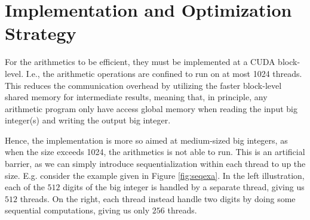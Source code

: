 \section{Implementation and Optimization Strategy}
\label{sec:strat}

For the arithmetics to be efficient, they must be implemented at a CUDA
block-level. I.e., the arithmetic operations are confined to run on at most 1024
threads. This reduces the communication overhead by utilizing the faster
block-level shared memory for intermediate results, meaning that, in principle,
any arithmetic program only have access global memory when reading the input big
integer(s) and writing the output big integer.

Hence, the implementation is more so aimed at medium-sized big integers, as when
the size exceeds 1024, the arithmetics is not able to run. This is an artificial
barrier, as we can simply introduce sequentialization within each thread to up
the size. E.g. consider the example given in Figure \ref{fig:seqexa}. In the
left illustration, each of the $512$ digits of the big integer is handled by a
separate thread, giving us $512$ threads. On the right, each thread instead
handle two digits by doing some sequential computations, giving us only $256$
threads.

